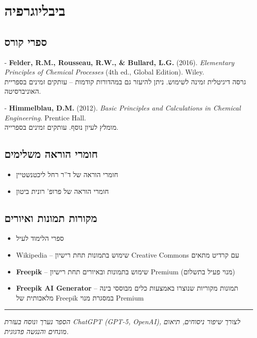 \documentclass[
  hebrew,
  letterpaper,
  DIV=11,
  numbers=noendperiod]{scrreprt}
\providecommand{\tightlist}{%
  \setlength{\itemsep}{0pt}\setlength{\parskip}{0pt}}
\begin{document}

\chapter{ביבליוגרפיה}\label{ux5d1ux5d9ux5d1ux5dcux5d9ux5d5ux5d2ux5e8ux5e4ux5d9ux5d4}

\section{ספרי קורס}\label{ux5e1ux5e4ux5e8ux5d9-ux5e7ux5d5ux5e8ux5e1}

{ - \textbf{Felder, R.M., Rousseau, R.W., \& Bullard, L.G.} (2016).
\emph{Elementary Principles of Chemical Processes} (4th ed., Global
Edition). Wiley. }\\
גרסה דיגיטלית זמינה לשימוש. ניתן להיעזר גם במהדורות קודמות -- עותקים
זמינים בספריית האוניברסיטה.

{ - \textbf{Himmelblau, D.M.} (2012). \emph{Basic Principles and
Calculations in Chemical Engineering}. Prentice Hall. }\\
מומלץ לעיון נוסף. עותקים זמינים בספרייה.

\section{חומרי הוראה
משלימים}\label{ux5d7ux5d5ux5deux5e8ux5d9-ux5d4ux5d5ux5e8ux5d0ux5d4-ux5deux5e9ux5dcux5d9ux5deux5d9ux5dd}

\begin{itemize}
\tightlist
\item
  חומרי הוראה של ד''ר רחל ליכטנשטיין\\
\item
  חומרי הוראה של פרופ' רונית ביטון
\end{itemize}

\section{מקורות תמונות
ואיורים}\label{ux5deux5e7ux5d5ux5e8ux5d5ux5ea-ux5eaux5deux5d5ux5e0ux5d5ux5ea-ux5d5ux5d0ux5d9ux5d5ux5e8ux5d9ux5dd}

\begin{itemize}
\tightlist
\item
  ספרי הלימוד לעיל\\
\item
  Wikipedia -- שימוש בתמונות תחת רישיון Creative Commons עם קרדיט
  מתאים\\
\item
  \textbf{Freepik} -- שימוש בתמונות ובאיורים תחת רישיון Premium (מנוי
  פעיל בתשלום)\\
\item
  \textbf{Freepik AI Generator} -- תמונות מקוריות שנוצרו באמצעות כלים
  מבוססי בינה מלאכותית של Freepik במסגרת מנוי Premium
\end{itemize}

\begin{center}\rule{0.5\linewidth}{0.5pt}\end{center}

\emph{הספר נערך ונוסח בעזרת ChatGPT (GPT-5, OpenAI), לצורך שיפור
ניסוחים, תיאום מונחים והנגשה פדגוגית.}
\end{document}
